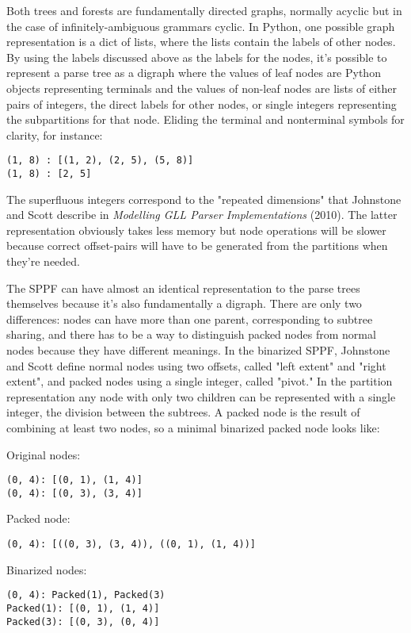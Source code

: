 \documentclass[12pt]{article}
\begin{document}
Both trees and forests are fundamentally directed graphs, normally
acyclic but in the case of infinitely-ambiguous grammars cyclic.  In
Python, one possible graph representation is a dict of lists, where
the lists contain the labels of other nodes.  By using the labels
discussed above as the labels for the nodes, it's possible to
represent a parse tree as a digraph where the values of leaf nodes are
Python objects representing terminals and the values of non-leaf nodes
are lists of either pairs of integers, the direct labels for other
nodes, or single integers representing the subpartitions for that
node.  Eliding the terminal and nonterminal symbols for clarity, for
instance:

\begin{lstlisting}
(1, 8) : [(1, 2), (2, 5), (5, 8)]
(1, 8) : [2, 5]
\end{lstlisting}

The superfluous integers correspond to the "repeated dimensions" that
Johnstone and Scott describe in \emph{Modelling GLL Parser
  Implementations} (2010).  The latter representation obviously takes
less memory but node operations will be slower because correct
offset-pairs will have to be generated from the partitions when
they're needed.

The SPPF can have almost an identical representation to the parse
trees themselves because it's also fundamentally a digraph.  There are
only two differences: nodes can have more than one parent,
corresponding to subtree sharing, and there has to be a way to
distinguish packed nodes from normal nodes because they have different
meanings.  In the binarized SPPF, Johnstone and Scott define normal
nodes using two offsets, called "left extent" and "right extent", and
packed nodes using a single integer, called "pivot."  In the
partition representation any node with only two children can be
represented with a single integer, the division between the subtrees.
A packed node is the result of combining at least two nodes, so a
minimal binarized packed node looks like:

Original nodes:
\begin{lstlisting}
(0, 4): [(0, 1), (1, 4)]
(0, 4): [(0, 3), (3, 4)]
\end{lstlisting}

Packed node:
\begin{lstlisting}
(0, 4): [((0, 3), (3, 4)), ((0, 1), (1, 4))]
\end{lstlisting}

Binarized nodes:
\begin{lstlisting}
(0, 4): Packed(1), Packed(3)
Packed(1): [(0, 1), (1, 4)]
Packed(3): [(0, 3), (0, 4)]
\end{lstlisting}
\end{document}

